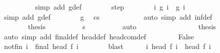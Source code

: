 \begin{isabellebody}
\ \ \ \ \ \ \ \ \isamarkupfalse%
\ {\isacharparenleft}simp\ add{\isacharcolon}\ g{\isacharunderscore}def{\isacharparenright}\isanewline
\ \ \ \ \ \ \isamarkupfalse%
\ step\isanewline
\ \ \ \ \ \ \isamarkupfalse%
\ {\isachardoublequoteopen}{\isasymforall}i{\isachardot}\ {\isasymGamma}{\isasymturnstile}g\ i\ {\isasymrightarrow}\ g\ {\isacharparenleft}i\ {\isacharplus}\ {}{\isacharparenright}{\isachardoublequoteclose}\isanewline
\ \ \ \ \ \ \ \ \isamarkupfalse%
\ {\isacharparenleft}simp\ add{\isacharcolon}\ g{\isacharunderscore}def{\isacharparenright}\isanewline
\ \ \ \ \ \ \isamarkupfalse%
\ g{\isacharunderscore}{}\ \isamarkupfalse%
\ {\isachardoublequoteopen}{\isasymGamma}{\isasymturnstile}{\isacharparenleft}cs{\isacharprime}{\isacharparenright}\ {\isasymrightarrow}\ {\isasymdots}{\isacharparenleft}{\isasyminfinity}{\isacharparenright}{\isachardoublequoteclose}\isanewline
\ \ \ \ \ \ \ \ \isamarkupfalse%
\ {\isacharparenleft}auto\ simp\ add{\isacharcolon}\ inf{\isacharunderscore}def{\isacharparenright}\isanewline
\ \ \ \ \ \ \isamarkupfalse%
\isanewline
\ \ \ \ \ \ \isamarkupfalse%
\ {\isacharquery}thesis\isanewline
\ \ \ \ \ \ \ \ \isamarkupfalse%
\ s{\isacharprime}\isanewline
\ \ \ \ \ \ \ \ \isamarkupfalse%
\ auto\isanewline
\ \ \ \ \isacommand{{\isacharbraceright}}\isamarkupfalse%
\isanewline
\ \ \ \ \isamarkupfalse%
\ \isanewline
\ \ \ \ \isamarkupfalse%
\ {\isacharquery}thesis\isanewline
\ \ \ \ \ \ \isamarkupfalse%
\ {\isacharparenleft}auto\ simp\ add{\isacharcolon}\ final{\isacharunderscore}def\ head{\isacharunderscore}def\ head{\isacharunderscore}com{\isacharunderscore}def{\isacharparenright}\isanewline
\ \ \isamarkupfalse%
\isanewline
\ \ \ \ \isamarkupfalse%
\ False\isanewline
\ \ \ \ \isamarkupfalse%
\ \isamarkupfalse%
\ not{\isacharunderscore}fin{\isacharcolon}\ {\isachardoublequoteopen}{\isasymforall}i{\isachardot}\ {\isasymnot}\ final\ {\isacharparenleft}head\ {\isacharparenleft}f\ i{\isacharparenright}{\isacharparenright}{\isachardoublequoteclose}\isanewline
\ \ \ \ \ \ \isamarkupfalse%
\ blast\isanewline
\ \ \ \ \isamarkupfalse%
\ {\isachardoublequoteopen}{\isasymforall}i{\isachardot}\ {\isasymGamma}{\isasymturnstile}head\ {\isacharparenleft}f\ i{\isacharparenright}\ {\isasymrightarrow}\ head\ {\isacharparenleft}f\ {\isacharparenleft}i\ {\isacharplus}\ {}{\isacharparenright}{\isacharparenright}{\isachardoublequoteclose}\isanewline

\end{isabellebody}
